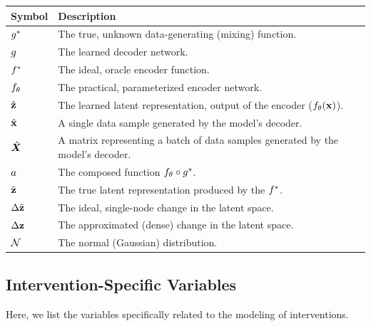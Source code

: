 \begin{table}[H]
\begin{tabularx}{\textwidth}{l X}
\toprule
\textbf{Symbol} & \textbf{Description} \\
\midrule
$g^*$ & The true, unknown data-generating (mixing) function. \\
$g$ & The learned decoder network. \\
$f^*$ & The ideal, oracle encoder function. \\
$f_\theta$ & The practical, parameterized encoder network. \\
$\hat{{\mathbf{z}}}$ & The learned latent representation, output of the encoder ($f_\theta({\mathbf{x}})$). \\
$\hat{{\mathbf{x}}}$ & A single data sample generated by the model's decoder. \\
$\hat{{\bm{X}}}$ & A matrix representing a batch of data samples generated by the model's decoder. \\
$a$ & The composed function $f_\theta \circ g^*$. \\
$\tilde{{\mathbf{z}}}$ & The true latent representation produced by the $f^*$. \\
$\Delta\tilde{{\mathbf{z}}}$ & The ideal, single-node change in the latent space. \\
$\Delta{\mathbf{z}}$ & The approximated (dense) change in the latent space. \\
${\mathcal{N}}$ & The normal (Gaussian) distribution. \\
\bottomrule
\end{tabularx}
\end{table}

\subsection{Intervention-Specific Variables}
\label{app:nomenclature:interventions}

Here, we list the variables specifically related to the modeling of interventions.


